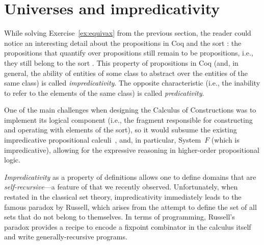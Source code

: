 \section{Universes and \texorpdfstring{\protect{}}{Prop} impredicativity}




While solving Exercise~\ref{ex:equivax} from the previous section,
the reader could notice an interesting detail about the propositions
in Coq and the sort : the propositions that quantify over
propositions still remain to be propositions, i.e., they still belong
to the sort . This property of propositions in Coq (and, in
general, the ability of entities of some class to abstract over the
entities of the same class) is called
\textit{impredicativity}.  The opposite
characteristic (i.e., the inability to refer to the elements of the
same class) is called \textit{predicativity}. 


One of the main challenges when designing the Calculus of
Constructions was to implement its logical component (i.e., the
fragment responsible for constructing and operating with elements of
the  sort), so it would subsume the existing impredicative
propositional calculi~\cite{Coquand-Huet:ECCA85}, and, in
particular, System~$F$ (which is impredicative), allowing for the
expressive reasoning in higher-order propositional logic.


\textit{Impredicativity} as a property of definitions allows one to define
domains that are \textit{self-recursive}---a feature of  that we
recently observed. Unfortunately, when restated in the classical set
theory, impredicativity immediately leads to the famous paradox by Russell,
which arises from the attempt to define the set of all sets
that do not belong to themselves. In terms of programming,
Russell's paradox provides a recipe to encode a fixpoint combinator in
the calculus itself and write generally-recursive programs.


